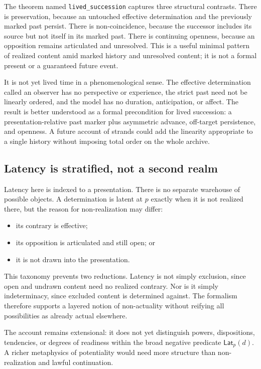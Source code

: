 \documentclass[11pt]{article}
\theoremstyle{definition}
\theoremstyle{remark}
\newcommand{\lean}[1]{\nolinkurl{#1}}
\newcommand{\Lat}{\mathsf{Lat}}
\begin{document}
The theorem named \lean{lived_succession} captures three structural contrasts.
There is preservation, because an untouched effective determination and the
previously marked past persist. There is non-coincidence, because the
successor includes its source but not itself in its marked past. There is
continuing openness, because an opposition remains articulated and unresolved.
This is a useful minimal pattern of realized content amid marked history and
unresolved content; it is not a formal present or a guaranteed future event.

It is not yet lived time in a phenomenological sense. The effective
determination called an observer has no perspective or experience, the strict
past need not be linearly ordered, and the model has no duration, anticipation,
or affect. The result is better understood as a formal precondition for lived
succession: a presentation-relative past marker plus asymmetric advance,
off-target persistence, and openness. A future account of strands could add
the linearity appropriate to a single history without imposing total order on
the whole archive.

\subsection{Latency is stratified, not a second realm}

Latency here is indexed to a presentation. There is no separate warehouse of
possible objects. A determination is latent at \(p\) exactly when it is not
realized there, but the reason for non-realization may differ:

\begin{itemize}
  \item its contrary is effective;
  \item its opposition is articulated and still open; or
  \item it is not drawn into the presentation.
\end{itemize}

This taxonomy prevents two reductions. Latency is not simply exclusion, since
open and undrawn content need no realized contrary. Nor is it simply
indeterminacy, since excluded content is determined against. The formalism
therefore supports a layered notion of non-actuality without reifying all
possibilities as already actual elsewhere.

The account remains extensional: it does not yet distinguish powers,
dispositions, tendencies, or degrees of readiness within the broad negative
predicate \(\Lat_p(d)\). A richer metaphysics of potentiality would need more
structure than non-realization and lawful continuation.
\end{document}
